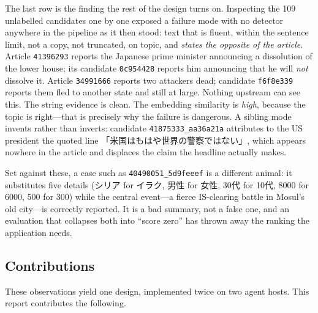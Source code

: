 \documentclass[conference]{IEEEtran}
\begin{document}
The last row is the finding the rest of the design turns on. Inspecting
the 109 unlabelled candidates one by one exposed a failure mode with no
detector anywhere in the pipeline as it then stood: text that is fluent,
within the sentence limit, not a copy, not truncated, on topic, and
\emph{states the opposite of the article}. Article \texttt{41396293}
reports the Japanese prime minister announcing a dissolution of the
lower house; its candidate \texttt{0c954428} reports him announcing that
he will \emph{not} dissolve it. Article \texttt{34991666} reports two
attackers dead; candidate \texttt{f6f8e339} reports them fled to another
state and still at large. Nothing upstream can see this. The string
evidence is clean. The embedding similarity is \emph{high}, because the
topic is right---that is precisely why the failure is dangerous. A
sibling mode invents rather than inverts: candidate
\texttt{41875333\_aa36a21a} attributes to the US president the quoted
line 「米国はもはや世界の警察ではない」, which appears nowhere in the
article and displaces the claim the headline actually makes.

Set against these, a case such as \texttt{40490051\_5d9feeef} is a
different animal: it substitutes five details (シリア for イラク,
男性 for 女性, 30代 for 10代, 8000 for 6000, 500 for 300) while the
central event---a fierce IS-clearing battle in Mosul's old city---is
correctly reported. It is a bad summary, not a false one, and an
evaluation that collapses both into ``score zero'' has thrown away the
ranking the application needs.

\subsection{Contributions}
These observations yield one design, implemented twice on two agent
hosts. This report contributes the following.
\end{document}
